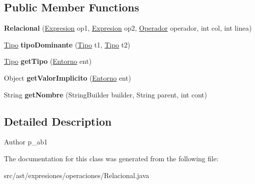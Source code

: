 \subsection*{Public Member Functions}
\begin{DoxyCompactItemize}
\item 
\mbox{\label{classast_1_1expresiones_1_1operaciones_1_1_relacional_affa7476b38b3736f30273f82004581d5}} 
{\bfseries Relacional} (\mbox{\hyperlink{interfaceast_1_1_expresion}{Expresion}} op1, \mbox{\hyperlink{interfaceast_1_1_expresion}{Expresion}} op2, \mbox{\hyperlink{enumast_1_1expresiones_1_1operaciones_1_1_operacion_1_1_operador}{Operador}} operador, int col, int linea)
\item 
\mbox{\label{classast_1_1expresiones_1_1operaciones_1_1_relacional_af74fb340d94f2360447571bd2c08598a}} 
\mbox{\hyperlink{classentorno_1_1_tipo}{Tipo}} {\bfseries tipo\+Dominante} (\mbox{\hyperlink{classentorno_1_1_tipo}{Tipo}} t1, \mbox{\hyperlink{classentorno_1_1_tipo}{Tipo}} t2)
\item 
\mbox{\label{classast_1_1expresiones_1_1operaciones_1_1_relacional_aac8d5024ad8c235c1aff71e86e5424eb}} 
\mbox{\hyperlink{classentorno_1_1_tipo}{Tipo}} {\bfseries get\+Tipo} (\mbox{\hyperlink{classentorno_1_1_entorno}{Entorno}} ent)
\item 
\mbox{\label{classast_1_1expresiones_1_1operaciones_1_1_relacional_a0ac356f08c68fd01fceddfaee94d8f94}} 
Object {\bfseries get\+Valor\+Implicito} (\mbox{\hyperlink{classentorno_1_1_entorno}{Entorno}} ent)
\item 
\mbox{\label{classast_1_1expresiones_1_1operaciones_1_1_relacional_a6b2590ece1035e14f2924c9cdeaabe41}} 
String {\bfseries get\+Nombre} (String\+Builder builder, String parent, int cont)
\end{DoxyCompactItemize}


\subsection{Detailed Description}
\begin{DoxyAuthor}{Author}
p\+\_\+ab1 
\end{DoxyAuthor}


The documentation for this class was generated from the following file\+:\begin{DoxyCompactItemize}
\item 
src/ast/expresiones/operaciones/Relacional.\+java\end{DoxyCompactItemize}
